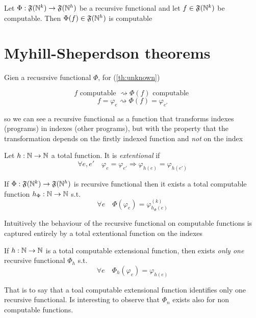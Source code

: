 \begin{theorem}\label{th:unknown}
  Let $\Phi : \mathfrak{F}(\mathbb{N}^k) \rightarrow \mathfrak{F}(\mathbb{N}^h)$
  be a recursive functional and let $f \in \mathfrak{F}(\mathbb{N}^k)$ be
  computable. Then $\Phi(f) \in \mathfrak{F}(\mathbb{N}^h)$ is computable
\end{theorem}

\section{Myhill-Sheperdson theorems}
Gien a recusrsive functional $\Phi$, for (\ref{th:unknown})

\[
  f \mbox{ computable } \rightsquigarrow \Phi(f) \mbox{ computable }
\]
\[
  f = \varphi_e \rightsquigarrow \Phi(f) = \varphi_{e'}
\]

so we can see a recursive functional as a function that transforms
indexes (programs) in indexes (other programs), but with the property
that the transformation depends on the firstly indexed function and
\emph{not} on the index

\begin{definition}
  Let $h : \mathbb{N} \rightarrow \mathbb{N}$ a total function. It is \emph{extentional} if
  \[
    \forall e,e' \quad \varphi_e = \varphi_{e'} \Rightarrow
    \varphi_{h(e)} = \varphi_{h(e')}
  \]
\end{definition}

\begin{theorem}
  If $\Phi : \mathfrak{F}(\mathbb{N}^k) \rightarrow \mathfrak{F}(\mathbb{N}^h)$ is
  recursive functional then it exists a total computable function
  $h_\Phi : \mathbb{N} \rightarrow \mathbb{N}$ s.t.
  \[
    \forall e \quad \Phi(\varphi_e) = \varphi_{h_\Phi(e)}^{(k)}
  \]
\end{theorem}

Intuitively the behaviour of the recursive functional on computable
functions is captured entirely by a total extentional function on the
indexes

\begin{theorem}\label{th:myhill-shepherdson2}
  If $h : \mathbb{N} \rightarrow \mathbb{N}$ is a total computable extensional function, then
  exists \emph{only one} recursive functional $\Phi_h$ s.t.
  \[
    \forall e \quad \Phi_h(\varphi_e) = \varphi_{h(e)}
  \]
\end{theorem}
That is to say that a toal computable extensional function identifies
only one recursive functional.  Is interesting to observe that
$\Phi_n$ exists also for non computable functions.


